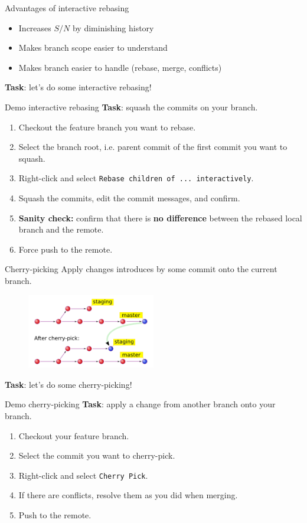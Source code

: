 \documentclass[compress,english,aspectratio=1610]{beamer}
\let\olditem\item
\renewcommand{\item}{\setlength{\itemsep}{\fill}\olditem}
\begin{document}
\begin{frame}{Advantages of interactive rebasing}
	\begin{itemize}
		\item Increases $S/N$ by diminishing history
		\item Makes branch scope easier to understand
		\item Makes branch easier to handle (rebase, merge, conflicts)
	\end{itemize}
	\textbf{Task}: let's do some interactive rebasing!
\end{frame}

\begin{frame}{Demo interactive rebasing}
	\textbf{Task}: squash the commits on your branch.
		\begin{enumerate}
			\item Checkout the feature branch you want to rebase.
			\item Select the branch root, i.e. parent commit of the first commit you want to squash.
			\item Right-click and select {\tt Rebase children of ... interactively}.
			\item Squash the commits, edit the commit messages, and confirm.
			\item \textbf{Sanity check:} confirm that there is \textbf{no difference} between the rebased local branch and the remote.
			\item Force push to the remote.
    		\end{enumerate}
\end{frame}

\begin{frame}{Cherry-picking}
	Apply changes introduces by some commit onto the current branch.
	\begin{figure}
     	\includegraphics[width=0.5\textwidth]{figures/git-cherry-pick.png}
    \end{figure}
	\textbf{Task}: let's do some cherry-picking!
\end{frame}

\begin{frame}{Demo cherry-picking}
	\textbf{Task}: apply a change from another branch onto your branch.
		\begin{enumerate}
			\item Checkout your feature branch.
			\item Select the commit you want to cherry-pick.
			\item Right-click and select {\tt Cherry Pick}.
			\item If there are conflicts, resolve them as you did when merging.
			\item Push to the remote.
    		\end{enumerate}
\end{frame}
\end{document}
